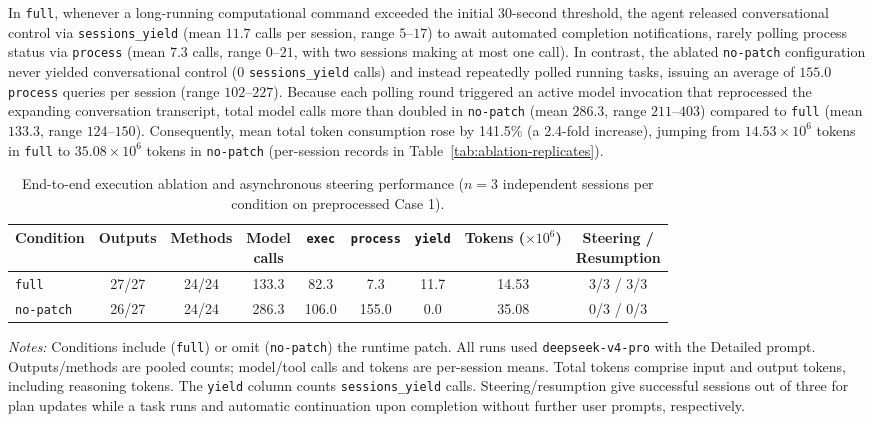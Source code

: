 \documentclass[10pt,letterpaper]{article}
\begin{document}
In \texttt{full}, whenever a long-running computational command exceeded the
initial 30-second threshold, the agent released conversational control via
\texttt{sessions\_yield} (mean $11.7$ calls per session, range $5\text{--}17$)
to await automated completion notifications, rarely polling process status via
\texttt{process} (mean $7.3$ calls, range $0\text{--}21$, with two sessions
making at most one call). In contrast, the ablated \texttt{no-patch}
configuration never yielded conversational control ($0$ \texttt{sessions\_yield}
calls) and instead repeatedly polled running tasks, issuing an average of
$155.0$ \texttt{process} queries per session (range $102\text{--}227$). Because
each polling round triggered an active model invocation that reprocessed the
expanding conversation transcript, total model calls more than doubled in
\texttt{no-patch} (mean $286.3$, range $211\text{--}403$) compared to
\texttt{full} (mean $133.3$, range $124\text{--}150$). Consequently, mean total
token consumption rose by 141.5\% (a 2.4-fold increase), jumping from
$14.53 \times 10^6$ tokens in \texttt{full} to $35.08 \times 10^6$ tokens in
\texttt{no-patch} (per-session records in Table~\ref{tab:ablation-replicates}).

\begin{table}[t]
\centering
\caption{End-to-end execution ablation and asynchronous steering performance
($n = 3$ independent sessions per condition on preprocessed Case 1).}
\label{tab:ablation-summary}
\normalsize
\setlength{\tabcolsep}{2pt}
\renewcommand{\arraystretch}{1.12}
\begin{tabular*}{\linewidth}{@{\extracolsep{\fill}}lcccccccc@{}}
\toprule
Condition & Outputs & Methods & \shortstack{Model\\calls}
  & \texttt{exec} & \texttt{process} & \texttt{yield}
  & \shortstack{Tokens\\($\times 10^6$)}
  & \shortstack{Steering /\\Resumption} \\
\midrule
\texttt{full} & 27/27 & 24/24 & 133.3 & 82.3 & 7.3 & 11.7 & 14.53 & 3/3 / 3/3 \\
\texttt{no-patch} & 26/27 & 24/24 & 286.3 & 106.0 & 155.0 & 0.0 & 35.08 & 0/3 / 0/3 \\
\bottomrule
\end{tabular*}
\par\vspace{0.4em}
\begin{minipage}{\linewidth}
\normalsize
\textit{Notes:} Conditions include (\texttt{full}) or omit
(\texttt{no-patch}) the runtime patch. All runs used
\texttt{deepseek-v4-pro} with the Detailed prompt. Outputs/methods are pooled
counts; model/tool calls and tokens are per-session means. Total tokens comprise
input and output tokens, including reasoning tokens. The \texttt{yield} column
counts \texttt{sessions\_yield} calls. Steering/resumption give successful
sessions out of three for plan updates while a task runs and automatic
continuation upon completion without further user prompts, respectively.
\end{minipage}
\end{table}
\end{document}
